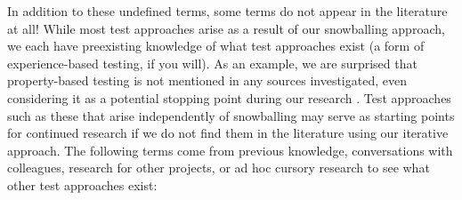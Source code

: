\ifnotpaper
    In addition to these undefined terms, some terms do not appear in
    the literature at all! While most test approaches arise as a result of our
    snowballing approach, we each have preexisting knowledge of what test
    approaches exist (a form of experience-based testing, if you will).
    As an example, we are surprised that property-based testing is not mentioned
    in any sources investigated, even considering it as a potential stopping point
    during our research%
    . Test approaches such as these that arise independently of snowballing
    may serve as starting points for continued research if we do not find
    them in the literature using our iterative approach. The following terms come
    from previous knowledge, conversations with colleagues, research for other
    projects, or ad hoc cursory research to see what other test approaches exist:
    \newline

